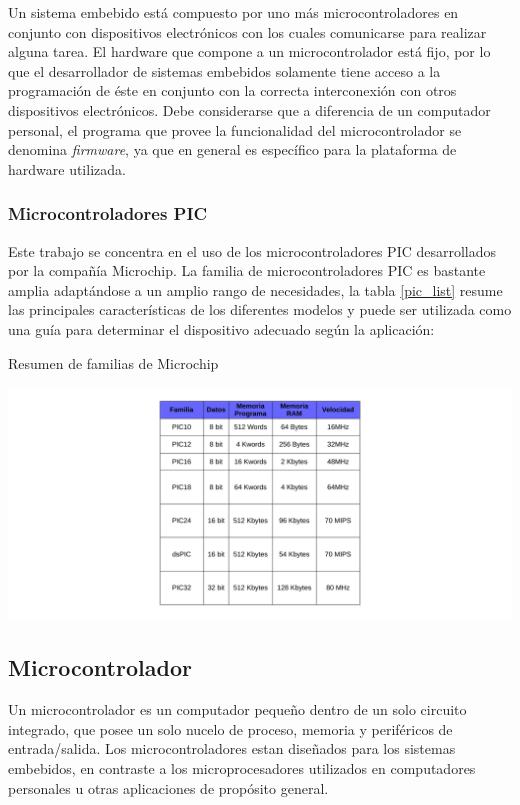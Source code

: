 Un sistema embebido está compuesto por uno más microcontroladores en conjunto con dispositivos electrónicos con los cuales comunicarse para realizar alguna tarea. 
El hardware que compone a un microcontrolador está fijo, por lo que el desarrollador de sistemas embebidos solamente tiene acceso a la programación de \'este en conjunto con la correcta interconexión con otros dispositivos electrónicos. Debe considerarse que a diferencia de un computador personal, el programa que provee la funcionalidad del microcontrolador se denomina \textit{firmware}, ya que en general es específico para la plataforma de hardware utilizada.

\subsubsection{Microcontroladores PIC}
Este trabajo se concentra en el uso de los microcontroladores PIC desarrollados por la compañía Microchip. La familia de microcontroladores  PIC es bastante amplia adaptándose a un amplio rango de necesidades, la tabla \ref{pic_list} resume las principales características de los diferentes modelos y puede ser utilizada como una guía para determinar el dispositivo adecuado según la aplicación:

\begin{table}[ht!]
	\caption{Resumen de familias de Microchip}\label{pic_list}
	\centering \includegraphics[width=\textwidth]{images/pic_list.pdf}
\end{table}
\subsection{Microcontrolador}
Un microcontrolador es un computador pequeño dentro de un solo circuito integrado, que posee un solo nucelo de proceso, memoria y perif\'ericos de entrada/salida. Los microcontroladores estan diseñados para los sistemas embebidos, en contraste a los microprocesadores utilizados en computadores personales u otras aplicaciones de propósito general.

